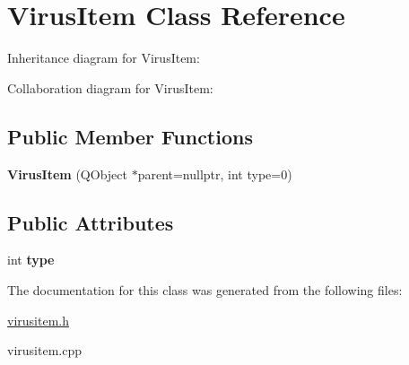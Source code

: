 \hypertarget{classVirusItem}{}\section{Virus\+Item Class Reference}
\label{classVirusItem}


Inheritance diagram for Virus\+Item\+:


Collaboration diagram for Virus\+Item\+:
\subsection*{Public Member Functions}
\begin{DoxyCompactItemize}
\item 
\mbox{\label{classVirusItem_ae7450d318c682e674a8cc33e79ba2976}} 
{\bfseries Virus\+Item} (Q\+Object $\ast$parent=nullptr, int type=0)
\end{DoxyCompactItemize}
\subsection*{Public Attributes}
\begin{DoxyCompactItemize}
\item 
\mbox{\label{classVirusItem_a30b647f5187f464c559b90bdd536e68f}} 
int {\bfseries type}
\end{DoxyCompactItemize}


The documentation for this class was generated from the following files\+:\begin{DoxyCompactItemize}
\item 
\hyperlink{virusitem_8h}{virusitem.\+h}\item 
virusitem.\+cpp\end{DoxyCompactItemize}
